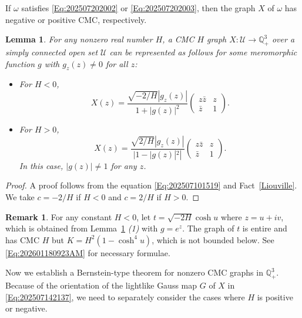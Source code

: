 \documentclass[12pt,reqno]{amsart}
\theoremstyle{plain} %
\newtheorem{lemma}[theorem]{Lemma}
\theoremstyle{definition}
\newtheorem{remark}[theorem]{Remark}
\numberwithin{equation}{section}
\newcommand{\qthreep}{\mathbb{Q}^3_+}
\newcommand{\h}{H}%
\begin{document}
If $\omega$ satisfies \eqref{Eq:202507202002} or \eqref{Eq:202507202003}, then the graph $X$ of $\omega$ has negative or positive CMC, respectively.

\begin{lemma}\label{coro:mean}
	For any nonzero real number $\h$, a CMC $\h$ graph $X:\mathcal{U}\to\qthreep$ over a simply connected open set $\mathcal{U}$
	can be represented as follows for some meromorphic function $g$ with $g_z (z) \ne0$ for all $z$:
	\begin{itemize}
		\item[(1)] For  $\h<0$,
		      \begin{equation}\label{Eq:202602200111AM}
			      X (z) =\frac{\sqrt{-2/\h}|g_z (z) |}{1+|g (z) |^2}\begin{pmatrix} z\bar{z} & z \\ \bar{z} & 1 \end{pmatrix}.
		      \end{equation}
		\item[(2)] For $\h>0$,
		      \begin{equation}\label{Eq:202602200112AM}
			      X (z) =\frac{\sqrt{2/\h}|g_z (z) |}{|1-|g (z) |^2|}\begin{pmatrix} z\bar{z} & z \\ \bar{z} & 1 \end{pmatrix}.
		      \end{equation}
		      In this case, $|g (z) |\ne1$ for any $z$.
	\end{itemize}
\end{lemma}
\begin{proof}
	A proof follows from the equation \eqref{Eq:202507101519} and  Fact~\ref{Liouville}.
	We take $c=-2/\h$ if $\h<0$ and $c=2/\h$ if $\h>0$.
\end{proof}
\begin{remark}\label{Rem:202601180320PM}
	For any constant $\h <0$, let
	$ t = \sqrt{-2\h} \cosh{u} $
	where $z=u+iv$, which is obtained from Lemma~\ref{coro:mean} \textit{(1)} with $g=e^z$. The graph of $t$ is entire and has CMC $\h$ but
	$K= \h^2( 1 - \cosh^4 u)$, which is not bounded below. See \eqref{Eq:202601180923AM} for necessary formulae.
\end{remark}

Now we establish a Bernstein-type theorem for nonzero CMC graphs in $\mathbb{Q}^3_+$. Because of the orientation of the lightlike Gauss map $G$  of $X$ in \eqref{Eq:202507142137}, we need to separately consider the cases where $\h$ is positive or negative.
\end{document}
